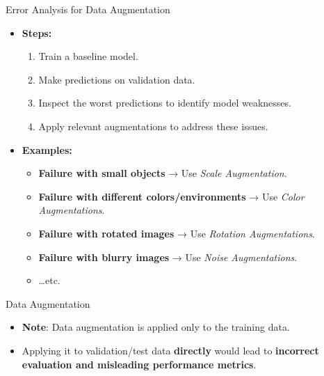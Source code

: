 \documentclass[10pt]{beamer}
\theoremstyle{remark}
\theoremstyle{definition}
\begin{document}
\begin{frame}{Error Analysis for Data Augmentation}
\begin{itemize}
    \item \textbf{Steps:}
    \begin{enumerate}
        \item Train a baseline model.
        \item Make predictions on validation data.
        \item Inspect the worst predictions to identify model weaknesses.
        \item Apply relevant augmentations to address these issues.
    \end{enumerate}

    \item \textbf{Examples:}
    \begin{itemize}
        \item \textbf{Failure with small objects} → Use \textit{Scale Augmentation}.
        \item \textbf{Failure with different colors/environments} → Use \textit{Color Augmentations}.
        \item \textbf{Failure with rotated images} → Use \textit{Rotation Augmentations}.
        \item \textbf{Failure with blurry images} → Use \textit{Noise Augmentations}.
        \item \dots etc.
    \end{itemize}
\end{itemize}
\end{frame}



\begin{frame}{Data Augmentation}
\begin{itemize}
    \item \textbf{Note}: Data augmentation is applied only to the training data.
    \item Applying it to validation/test data \textbf{directly} would lead to \textbf{incorrect evaluation and misleading performance metrics}.
\end{itemize}
\end{frame}
\end{document}
